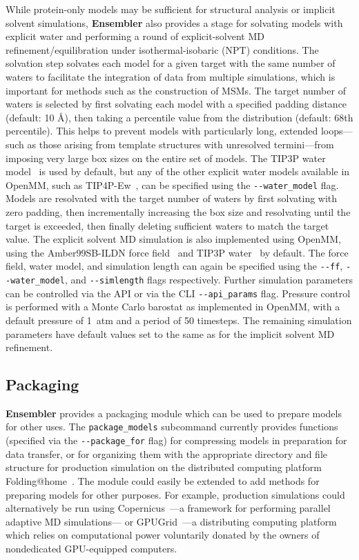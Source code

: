 \documentclass[aps,pre,twocolumn,nofootinbib,superscriptaddress,linenumbers]{revtex4-1}
\begin{document}
While protein-only models may be sufficient for structural analysis or implicit solvent simulations, {\bf Ensembler} also provides a stage for solvating models with explicit water and performing a round of explicit-solvent MD refinement/equilibration under isothermal-isobaric (NPT) conditions.
The solvation step solvates each model for a given target with the same number of waters to facilitate the integration of data from multiple simulations, which is important for methods such as the construction of MSMs.
The target number of waters is selected by first solvating each model with a specified padding distance (default: 10 \AA), then taking a percentile value from the distribution (default: 68th percentile).
This helps to prevent models with particularly long, extended loops---such as those arising from template structures with unresolved termini---from imposing very large box sizes on the entire set of models.
The TIP3P water model~\cite{tip3p} is used by default, but any of the other explicit water models available in OpenMM, such as TIP4P-Ew~\cite{tip4p-ew}, can be specified using the {\tt -{}-water\_model} flag.
Models are resolvated with the target number of waters by first solvating with zero padding, then incrementally increasing the box size and resolvating until the target is exceeded, then finally deleting sufficient waters to match the target value.
The explicit solvent MD simulation is also implemented using OpenMM, using the Amber99SB-ILDN force field~\cite{amber99sb-ildn} and TIP3P water~\cite{tip3p} by default.
The force field, water model, and simulation length can again be specified using the {\tt -{}-ff}, {\tt -{}-water\_model}, and {\tt -{}-simlength} flags respectively.
Further simulation parameters can be controlled via the API or via the CLI {\tt -{}-api\_params} flag.
Pressure control is performed with a Monte Carlo barostat as implemented in OpenMM, with a default pressure of 1~atm and a period of 50 timesteps.
The remaining simulation parameters have default values set to the same as for the implicit solvent MD refinement.

\subsection*{Packaging}

{\bf Ensembler} provides a packaging module which can be used to prepare models for other uses.
The {\tt package\_models} subcommand currently provides functions (specified via the {\tt -{}-package\_for} flag) for compressing models in preparation for data transfer, or for organizing them with the appropriate directory and file structure for production simulation on the distributed computing platform Folding@home~\cite{shirts-pande:science:2000:fah}.
The module could easily be extended to add methods for preparing models for other purposes.
For example, production simulations could alternatively be run using Copernicus~\cite{pronk:2011:copernicus,pronk:2015:copernicus}---a framework for performing parallel adaptive MD simulations--- or GPUGrid~\cite{buch:2010:gpugrid}---a distributing computing platform which relies on computational power voluntarily donated by the owners of nondedicated GPU-equipped computers.
\end{document}

